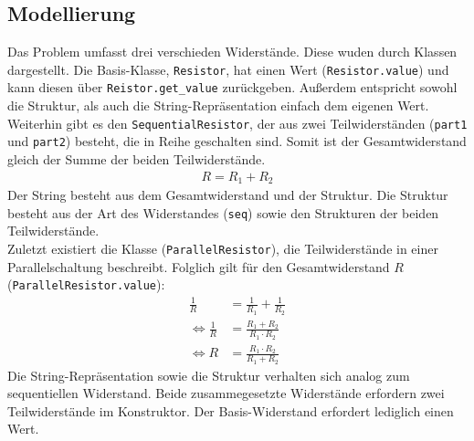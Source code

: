 \documentclass[a4paper,10pt,ngerman]{scrartcl}
\begin{document}
\subsection{Modellierung}
Das Problem umfasst drei verschieden Widerst\"ande. Diese wuden durch Klassen dargestellt.
Die Basis-Klasse, \texttt{Resistor}, hat einen Wert (\texttt{Resistor.value}) und kann diesen
\"uber \texttt{Reistor.get\_value} zur\"uckgeben. Au\ss erdem entspricht sowohl
die Struktur, als auch die String-Repr\"asentation einfach dem eigenen Wert.\\
\indent Weiterhin gibt es den \texttt{SequentialResistor}, der aus zwei Teilwiderst\"anden
(\texttt{part1} und \texttt{part2}) besteht, die in Reihe geschalten sind. Somit ist
der Gesamtwiderstand gleich der Summe der beiden Teilwiderst\"ande.
\begin{align}
    R = R_1 + R_2 
\end{align}
Der String besteht aus dem Gesamtwiderstand und der Struktur.
Die Struktur besteht aus der Art des Widerstandes (\texttt{seq}) sowie den
Strukturen der beiden Teilwiderst\"ande.\\ 
\indent Zuletzt existiert die Klasse (\texttt{ParallelResistor}), die
Teilwiderst\"ande in einer Parallelschaltung beschreibt. Folglich gilt f\"ur den
Gesamtwiderstand $R$ (\texttt{ParallelResistor.value}):
\begin{align}
  \frac{1}{R} &= \frac{1}{R_1} + \frac{1}{R_2} \\
  \Leftrightarrow \frac{1}{R} &= \frac{R_1 + R_2}{R_1 \cdot R_2}\\
  \Leftrightarrow R &=\frac{R_1\cdot R_2}{R_1 + R_2}
\end{align}
Die String-Repr\"asentation sowie die Struktur verhalten sich analog zum
sequentiellen Widerstand. Beide zusammegesetzte Widerst\"ande erfordern zwei
Teilwiderst\"ande im Konstruktor. Der Basis-Widerstand erfordert lediglich
einen Wert. 
\end{document}
